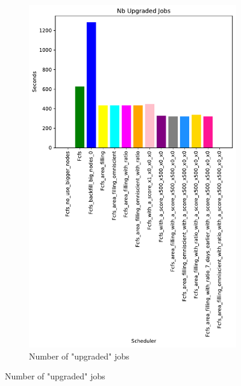 \documentclass[a4paper]{article}
\begin{document}
\begin{figure}[H]
\begin{subfigure}[b]{0.4\linewidth}\centering\includegraphics[width=0.7\linewidth]{MBSS/plot/Results_Size_And_Data_2022-01-17->2022-01-17_V9532_Nb_Upgraded_Jobs_450_128_32_256_4_1024.pdf}\caption{Number of "upgraded" jobs}\label{45}\end{subfigure}

\end{figure}
\end{document}
